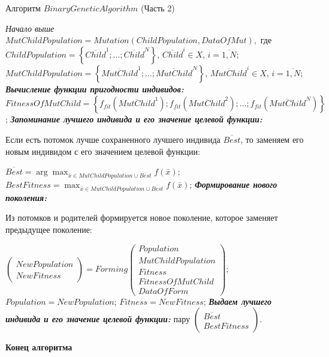 \begin{algorithm}
\caption{Алгоритм $ BinaryGeneticAlgorithm $ (Часть 2)}
\begin{algorithmic}
\State \textit{Начало выше}
\State $MutChildPopulation=Mutation(ChildPopulation, DataOfMut),$
\State где $ChildPopulation=\left\lbrace {\overline{Child}}^1; \ldots; {\overline{Child}}^N\right\rbrace $, ${\overline{Child}}^i \in X$, $i=\overline{1,N}$;
\State $MutChildPopulation=\left\lbrace {\overline{MutChild}}^1; \ldots; {\overline{MutChild}}^N\right\rbrace $, ${\overline{MutChild}}^i \in X$, $i=\overline{1,N}$;
\EndBlock
\BeginBlock \textbf{\textit{Вычисление функции пригодности индивидов:}}
\State $FitnessOfMutChild=\left\lbrace f_{fit} \left( \overline{MutChild}^1 \right); f_{fit} \left( \overline{MutChild}^2 \right); \ldots; f_{fit} \left( \overline{MutChild}^N \right) \right\rbrace $;
\EndBlock
\BeginBlock \textbf{\textit{Запоминание лучшего индивида и его значение целевой функции:}}
\State \parbox[t]{\dimexpr\linewidth-\algorithmicindent-\algorithmicindent}{Если есть потомок лучше сохраненного лучшего индивида $\overline{Best}$, то заменяем его новым индивидом с его значением целевой функции:\strut}
\State $\overline{Best}=\arg{ \max_{\bar{x} \in MutChildPopulation \cup \overline{Best}}{f\left ( \bar{x} \right )} }$;
\State $BestFitness=\max_{\bar{x} \in MutChildPopulation \cup \overline{Best}}{f\left ( \bar{x} \right )}$;
\EndBlock
\BeginBlock \textbf{\textit{Формирование нового поколения:}}
\State \parbox[t]{\dimexpr\linewidth-\algorithmicindent-\algorithmicindent}{Из потомков и родителей формируется новое поколение, которое заменяет предыдущее поколение:\strut}
\State $\left( \begin{array}{c} NewPopulation \\ NewFitness \end{array}\right)=Forming\left( \begin{array}{c} Population \\ MutChildPopulation \\ Fitness \\ FitnessOfMutChild \\ DataOfForm \end{array}\right)$;
\State $Population=NewPopulation$;
\State $Fitness=NewFitness$;
\EndBlock
\EndFor
\BeginBlock \textbf{\textit{Выдаем лучшего индивида и его значение целевой функции:}}
\State \Return пару $\left( \begin{array}{c} \overline{Best} \\ BestFitness \end{array}\right)$. 
\EndBlock

\State \textbf{Конец алгоритма}
\end{algorithmic}
\end{algorithm}

